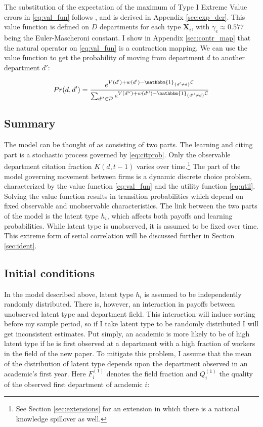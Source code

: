 The substitution of the expectation of the maximum of Type I Extreme Value errors
in \eqref{eq:val_fun} follows \citet{rust1987optimal}, and is derived in Appendix \ref{sec:exp_der}. This value function
 is defined on $D$ departments for each type $\mathbf{X}_i$, with $\gamma_e \approx 0.577$ being the Euler-Mascheroni constant. I
show in Appendix \ref{sec:contr_map} that the natural operator on \eqref{eq:val_fun} is a
contraction mapping. We can use the value function to get the
probability of moving from department $d$ to another department $d'$:

\begin{equation}
    Pr(d,d') = \frac{e^{V(d') + w(d') - \mathbbm{1}_{\{d'\neq d\}}\mathcal{C}}}{\sum_{d'' \in \mathcal{D}} e^{V(d'') + w(d'') - \mathbbm{1}_{\{d''\neq d\}} \mathcal{C}}}
    \label{eq:trans}
\end{equation}

\subsection{Summary} 

The model can be thought of as consisting of two parts.  The learning and citing part is 
a stochastic process governed by \eqref{eq:citprob}.  Only the observable department 
citation fraction $K(d,t-1)$ varies over time.\footnote{See Section \ref{sec:extensions} for an extension 
in which there is a national knowledge spillover as well.}
The part of the model governing movement between firms is a dynamic discrete
choice problem, characterized by the value
function \eqref{eq:val_fun} and the utility function \eqref{eq:util}.
 Solving the value function results in transition probabilities
 which depend on fixed observable and unobservable characteristics.  The link between the two parts
 of the model is the latent type $h_i$, which affects both
payoffs and learning probabilities.  While latent type is unobserved, it is assumed
to be fixed over time.  This extreme form of serial correlation
 will be discussed further in Section \ref{sec:ident}.

\subsection{Initial conditions}
\label{sec:init_cond}

In the model described above, latent type $h_i$ is assumed to be
independently randomly distributed. There is, however, an interaction in
payoffs between unobserved latent type and department field.
This interaction will induce sorting before my sample period, so if I
take latent type to be randomly distributed I will get inconsistent
estimates. Put simply, an academic is more likely to be of high latent type if he is
first observed at a department with a high fraction of workers in the field of
the new paper. To mitigate this
problem, I assume that the mean of the distribution of latent
type depends upon the department observed in an academic's first year.  Here $F^{(1)}_i$ denotes the 
field fraction and $Q^{(1)}_i$ the quality of the observed first department of academic $i$:


